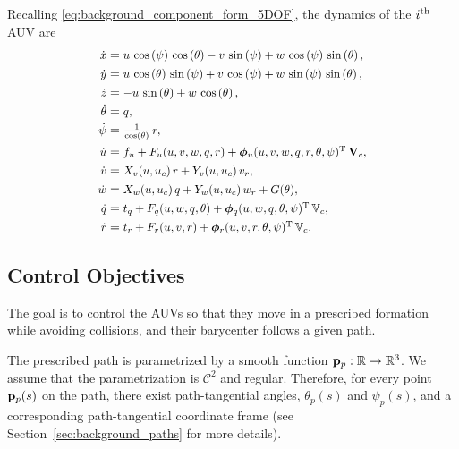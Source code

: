 Recalling \eqref{eq:background_component_form_5DOF}, the dynamics of the $i^{\rm th}$ AUV are
\begin{subequations}
    \begin{align}
        \scale[0.93]{\dot{x}} &= \scale[0.93]{u\,\cos\left(\psi \right)\,\cos\left(\theta \right)-v\,\sin\left(\psi \right)+w\,\cos\left(\psi \right)\,\sin\left(\theta \right),} \\
        \scale[0.93]{\dot{y}} &= \scale[0.93]{u\,\cos\left(\theta \right)\,\sin\left(\psi \right)+v\,\cos\left(\psi \right)+w\,\sin\left(\psi \right)\,\sin\left(\theta \right),} \\
        \scale[0.93]{\dot{z}} &= \scale[0.93]{-u\,\sin\left(\theta \right)+w\,\cos\left(\theta \right),} \\
        \scale[0.93]{\dot{\theta}} &= \scale[0.93]{q,} \label{eq:nsb_5dof_theta_dot} \\
        \scale[0.93]{\dot{\psi}} &= \scale[0.93]{\frac{1}{\cos\left(\theta \right)}\,r,} \label{eq:nsb_5dof_psi_dot} \\
        \scale[0.93]{\dot{u}} &= \scale[0.93]{f_u + F_u(u, v, w, q, r) + \bs{\phi}_u(u, v, w, q, r, \theta, \psi)\T\,\ocean,} \label{eq:nsb_5dof_u_dot} \\
        \scale[0.93]{\dot{v}} &= \scale[0.93]{X_v(u, u_c)\,r + Y_v(u, u_c)\,v_r,} \\
        \scale[0.93]{\dot{w}} &= \scale[0.93]{X_w(u, u_c)\,q + Y_w(u, u_c)\,w_r + G(\theta),} \\
        \scale[0.93]{\dot{q}} &= \scale[0.93]{t_q + F_q(u, w, q, \theta) + \bs{\phi}_q(u, w, q, \theta, \psi)\T\,\mathbb{V}_c,} \label{eq:nsb_5dof_q_dot} \\
        \scale[0.93]{\dot{r}} &= \scale[0.93]{t_r + F_r(u, v, r) + \bs{\phi}_r(u, v, r, \theta, \psi)\T\,\mathbb{V}_c,} \label{eq:nsb_5dof_r_dot} 
    \end{align} \label{eq:nsb_5dof_components}
\end{subequations}

\subsection{Control Objectives}
\label{sec:nsb_5dof_objectives}
The goal is to control the AUVs so that they move in a prescribed formation while avoiding collisions, and their barycenter follows a given path.

The prescribed path is parametrized by a smooth function $\mathbf{p}_p: \mathbb{R} \rightarrow \mathbb{R}^3$.
We assume that the parametrization is $\mathcal{C}^2$ and regular.
Therefore, for every point $\mathbf{p}_p(s)$ on the path, there exist path-tangential angles, $\theta_p(s)$ and $\psi_p(s)$, and a corresponding path-tangential coordinate frame (see Section~\ref{sec:background_paths} for more details).

